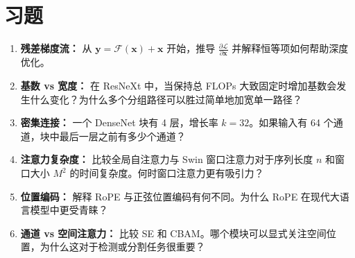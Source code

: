 \section{习题}

\begin{enumerate}
    \item \textbf{残差梯度流：} 从 $\mathbf{y} = \mathcal{F}(\mathbf{x}) + \mathbf{x}$ 开始，推导 $\frac{\partial \mathcal{L}}{\partial \mathbf{x}}$ 并解释恒等项如何帮助深度优化。

    \item \textbf{基数 vs 宽度：} 在 ResNeXt 中，当保持总 FLOPs 大致固定时增加基数会发生什么变化？为什么多个分组路径可以胜过简单地加宽单一路径？

    \item \textbf{密集连接：} 一个 DenseNet 块有 4 层，增长率 $k=32$。如果输入有 64 个通道，块中最后一层之前有多少个通道？

    \item \textbf{注意力复杂度：} 比较全局自注意力与 Swin 窗口注意力对于序列长度 $n$ 和窗口大小 $M^2$ 的时间复杂度。何时窗口注意力更有吸引力？

    \item \textbf{位置编码：} 解释 RoPE 与正弦位置编码有何不同。为什么 RoPE 在现代大语言模型中更受青睐？

    \item \textbf{通道 vs 空间注意力：} 比较 SE 和 CBAM。哪个模块可以显式关注空间位置，为什么这对于检测或分割任务很重要？
\end{enumerate}

